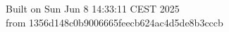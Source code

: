{\noindent Built on Sun Jun  8 14:33:11 CEST 2025} \\ 
 {\noindent from 1356d148c0b9006665feecb624ac4d5de8b3cccb}
